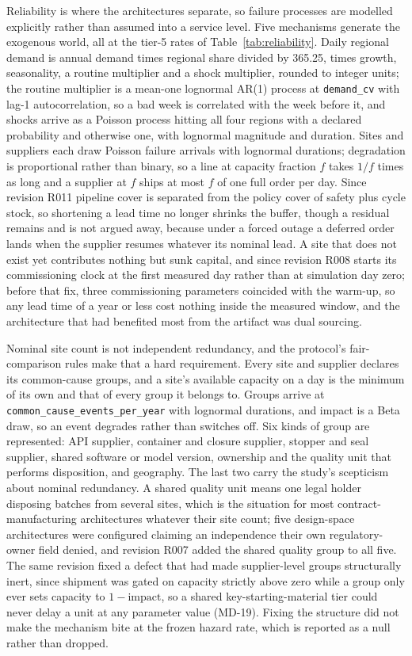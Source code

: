 Reliability is where the architectures separate, so failure processes are modelled explicitly
rather than assumed into a service level. Five mechanisms generate the exogenous world, all at
the tier-5 rates of Table~\ref{tab:reliability}. Daily regional demand is annual demand times
regional share divided by 365.25, times growth, seasonality, a routine multiplier and a shock
multiplier, rounded to integer units; the routine multiplier is a mean-one lognormal AR(1)
process at \texttt{demand\_cv} with lag-1 autocorrelation, so a bad week is correlated with the
week before it, and shocks arrive as a Poisson process hitting all four regions with a declared
probability and otherwise one, with lognormal magnitude and duration. Sites and suppliers each
draw Poisson failure arrivals with lognormal durations; degradation is proportional rather than
binary, so a line at capacity fraction $f$ takes $1/f$ times as long and a supplier at $f$ ships
at most $f$ of one full order per day. Since revision R011 pipeline cover is separated from the
policy cover of safety plus cycle stock, so shortening a lead time no longer shrinks the buffer,
though a residual remains and is not argued away, because under a forced outage a deferred order
lands when the supplier resumes whatever its nominal lead. A site that does not exist yet
contributes nothing but sunk capital, and since revision R008 starts its commissioning clock at
the first measured day rather than at simulation day zero; before that fix, three commissioning
parameters coincided with the warm-up, so any lead time of a year or less cost nothing inside
the measured window, and the architecture that had benefited most from the artifact was dual
sourcing.

Nominal site count is not independent redundancy, and the protocol's fair-comparison rules make
that a hard requirement. Every site and supplier declares its common-cause groups, and a site's
available capacity on a day is the minimum of its own and that of every group it belongs to.
Groups arrive at \texttt{common\_cause\_events\_per\_year} with lognormal durations, and impact
is a Beta draw, so an event degrades rather than switches off. Six kinds of group are
represented: API supplier, container and closure supplier, stopper and seal supplier, shared
software or model version, ownership and the quality unit that performs disposition, and
geography. The last two carry the study's scepticism about nominal redundancy. A shared quality
unit means one legal holder disposing batches from several sites, which is the situation for
most contract-manufacturing architectures whatever their site count; five design-space
architectures were configured claiming an independence their own regulatory-owner field denied,
and revision R007 added the shared quality group to all five. The same revision fixed a defect
that had made supplier-level groups structurally inert, since shipment was gated on capacity
strictly above zero while a group only ever sets capacity to $1-\text{impact}$, so a shared
key-starting-material tier could never delay a unit at any parameter value (MD-19). Fixing the
structure did not make the mechanism bite at the frozen hazard rate, which is reported as a null
rather than dropped.

